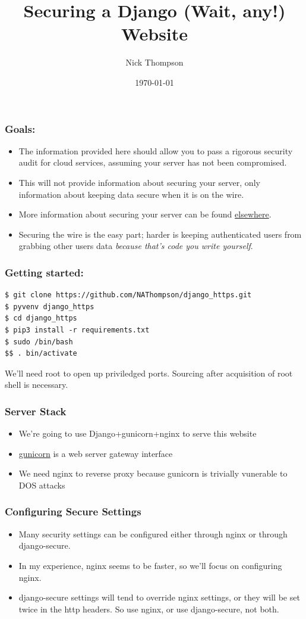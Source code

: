 \documentclass[9pt]{beamer}
\begin{document}
\title{Securing a Django (Wait, any!) Website}
\author{Nick Thompson} 
\date{\today}

\frame{\titlepage}

\begin{frame}[fragile]
\frametitle{Goals:}

\begin{itemize}
\item The information provided here should allow you to pass a rigorous security audit for cloud services, assuming your server has not been compromised.
\pause
\item This will not provide information about securing your server, only information about keeping data secure when it is on the wire.
\pause
\item More information about securing your server can be found \href{https://www.thefanclub.co.za/how-to/how-secure-ubuntu-1204-lts-server-part-1-basics}{elsewhere}.
\pause
\item Securing the wire is the easy part; harder is keeping authenticated users from grabbing other users data \emph{because that's code you write yourself}.
\end{itemize}
\end{frame}


\begin{frame}[fragile]
\frametitle{Getting started:}
\begin{verbatim}
$ git clone https://github.com/NAThompson/django_https.git
$ pyvenv django_https
$ cd django_https
$ pip3 install -r requirements.txt
$ sudo /bin/bash
$$ . bin/activate
\end{verbatim}
\pause
We'll need root to open up priviledged ports. Sourcing after acquisition of root shell is necessary.
\end{frame}

\begin{frame}
\frametitle{Server Stack}
\begin{itemize}
\item We're going to use Django+gunicorn+nginx to serve this website
\pause
\item \href{http://gunicorn.org/\#deployment}{gunicorn} is a web server gateway interface
\pause
\item We need nginx to reverse proxy because gunicorn is trivially vunerable to DOS attacks
\pause
\end{itemize}
\end{frame}

\begin{frame}[fragile]
\frametitle{Configuring Secure Settings}
\begin{itemize}
\item Many security settings can be configured either through nginx or through django-secure.
\pause
\item In my experience, nginx seems to be faster, so we'll focus on configuring nginx.
\pause 
\item django-secure settings will tend to override nginx settings, or they will be set twice in the http headers. So use nginx, or use django-secure, not both.
\end{itemize}
\end{frame}
\end{document}
